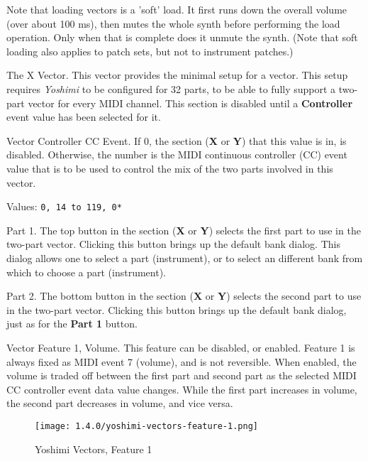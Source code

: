    Note that loading vectors is a 'soft' load. It first runs down the overall
   volume (over about 100 ms), then mutes the whole synth before performing
   the load operation. Only when that is complete does it unmute the synth.
   (Note that soft loading also applies to patch sets, but not to instrument
   patches.)

   The X Vector.
   This vector provides the minimal setup for a vector.  This setup requires
   \textsl{Yoshimi} to be configured for 32 parts, to be able to fully support
   a two-part vector for every MIDI channel.  This section is disabled until a
   \textbf{Controller} event value has been selected for it.

   Vector Controller CC Event.
   If 0, the section (\textbf{X} or \textbf{Y}) that this value is in, is
   disabled.  Otherwise, the number is the MIDI continuous controller (CC)
   event value that is to be used to control the mix of the two parts involved
   in this vector.

   Values: \texttt{0, 14 to 119, 0*}

   Part 1.
   The top button in the section (\textbf{X} or \textbf{Y}) selects the first
   part to use in the two-part vector.  Clicking this button brings up the
   default bank dialog.  This dialog allows one to select a part (instrument),
   or to select an different bank from which to choose a part (instrument).

   Part 2.
   The bottom button in the section (\textbf{X} or \textbf{Y}) selects the
   second part to use in the two-part vector.  Clicking this button brings up
   the default bank dialog, just as for the \textbf{Part 1} button.

   Vector Feature 1, Volume.
   This feature can be disabled, or enabled.  Feature 1 is always fixed as MIDI
   event 7 (volume), and is not reversible.
   When enabled, the volume is traded off between the first part and second part
   as the selected MIDI CC controller event data value changes.
   While the first part increases in volume, the second part decreases in
   volume, and vice versa.

\begin{figure}[H]
   \centering
   \texttt{[image: 1.4.0/yoshimi-vectors-feature-1.png]}
   \caption{Yoshimi Vectors, Feature 1}
   \label{fig:yoshimi_vectors_feature_1}
\end{figure}

